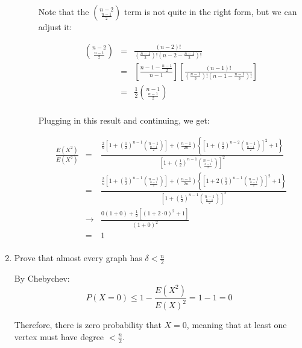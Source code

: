 \documentclass[letterpaper,12pt,fleqn]{article}
\begin{document}
\begin{enumerate}
\begin{description}
Note that the $\binom{n-2}{\frac{n-1}{2}}$ term is not quite in the right form,
but we can adjust it:

\begin{eqnarray*}
\binom{n-2}{\frac{n-1}{2}} &=&
    \frac{(n-2)!}
    {\left(\frac{n-1}{2}\right)!\left(n-2-\frac{n-1}{2}\right)!} \\
&=& \left[\frac{n-1-\frac{n-1}{2}}{n-1}\right]\left[\frac{(n-1)!}
    {\left(\frac{n-1}{2}\right)!\left(n-1-\frac{n-1}{2}\right)!}\right] \\
&=& \frac{1}{2}\binom{n-1}{\frac{n-1}{2}} \\
\end{eqnarray*}

Plugging in this result and continuing, we get:

\footnotesize\begin{eqnarray*}
\frac{E(X^2)}{E(X^2)}
&=& \frac{\frac{2}{n}\left[1+
    \left(\frac{1}{2}\right)^{n-1}\binom{n-1}{\frac{n-1}{2}}\right]+
    \left(\frac{n-1}{2n}\right)\left\{
    \left[1+\left(\frac{1}{2}\right)^{n-2}\binom{n-1}{\frac{n-1}{2}}
    \right]^2+1\right\}}
    {\left[1+
    \left(\frac{1}{2}\right)^{n-1}\binom{n-1}{\frac{n-1}{2}}\right]^2} \\
&=& \frac{\frac{2}{n}\left[1+
    \left(\frac{1}{2}\right)^{n-1}\binom{n-1}{\frac{n-1}{2}}\right]+
    \left(\frac{n-1}{2n}\right)\left\{
    \left[1+2\left(\frac{1}{2}\right)^{n-1}\binom{n-1}{\frac{n-1}{2}}
    \right]^2+1\right\}}
    {\left[1+
    \left(\frac{1}{2}\right)^{n-1}\binom{n-1}{\frac{n-1}{2}}\right]^2} \\
&\to& \frac{0(1+0)+\frac{1}{2}\left[(1+2\cdot0)^2+1\right]}{(1+0)^2} \\
&=& 1 \\
\end{eqnarray*}
\normalsize
\end{description}

\bigskip

\item Prove that almost every graph has $\delta<\frac{n}{2}$

\bigskip

By Chebychev:
\[P(X=0)\le1-\frac{E(X^2)}{E(X)^2}=1-1=0\]

Therefore, there is zero probability that $X=0$, meaning that at least one
vertex must have degree $<\frac{n}{2}$.

\end{enumerate}
\end{document}
